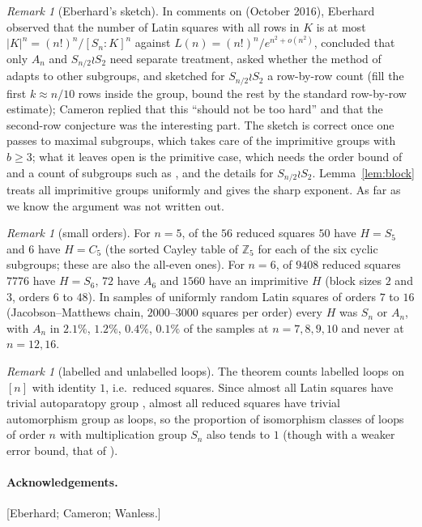 \documentclass[11pt]{amsart}
\theoremstyle{plain}
\theoremstyle{remark}
\newtheorem{remark}[theorem]{Remark}
\begin{document}
\begin{remark}[Eberhard's sketch]
In comments on \cite{Cam15} (October 2016), Eberhard observed that
the number of Latin squares with all rows in $K$ is at most
$|K|^n=(n!)^n/[S_n:K]^n$ against $L(n)=(n!)^n/e^{n^2+o(n^2)}$, concluded
that only $A_n$ and $S_{n/2}\wr S_2$ need separate treatment, asked
whether the method of \cite{HJ96} adapts to other subgroups, and
sketched for $S_{n/2}\wr S_2$ a row-by-row count (fill the first
$k\approx n/10$ rows inside the group, bound the rest by the standard
row-by-row estimate); Cameron replied that this ``should not be too
hard'' and that the second-row conjecture was the interesting part.
The sketch is correct once one passes to maximal subgroups, which
takes care of the imprimitive groups with $b\ge3$; what it leaves open
is the primitive case, which needs the order bound of \cite{PS80} and
a count of subgroups such as \cite{Pyb93}, and the details for
$S_{n/2}\wr S_2$.  Lemma~\ref{lem:block} treats all imprimitive groups
uniformly and gives the sharp exponent.  As far as we know the argument
was not written out.
\end{remark}

\begin{remark}[small orders]
For $n=5$, of the $56$ reduced squares $50$ have $H=S_5$ and $6$ have
$H=C_5$ (the sorted Cayley table of $\mathbb Z_5$ for each of the six
cyclic subgroups; these are also the all-even ones).  For $n=6$, of
$9408$ reduced squares $7776$ have $H=S_6$, $72$ have $A_6$ and $1560$
have an imprimitive $H$ (block sizes $2$ and $3$, orders $6$ to $48$).
In samples of uniformly random Latin squares of orders $7$ to $16$
(Jacobson--Matthews chain, $2000$--$3000$ squares per order) every $H$
was $S_n$ or $A_n$, with $A_n$ in $2.1\%$, $1.2\%$, $0.4\%$, $0.1\%$ of
the samples at $n=7,8,9,10$ and never at $n=12,16$.
\end{remark}

\begin{remark}[labelled and unlabelled loops]
The theorem counts labelled loops on $[n]$ with identity $1$, i.e.\
reduced squares.  Since almost all Latin squares have trivial
autoparatopy group \cite{MW05}, almost all reduced squares have trivial
automorphism group as loops, so the proportion of isomorphism classes
of loops of order $n$ with multiplication group $S_n$ also tends to
$1$ (though with a weaker error bound, that of \cite{MW05}).
\end{remark}

\paragraph{Acknowledgements.}  [Eberhard; Cameron; Wanless.]
\end{document}
